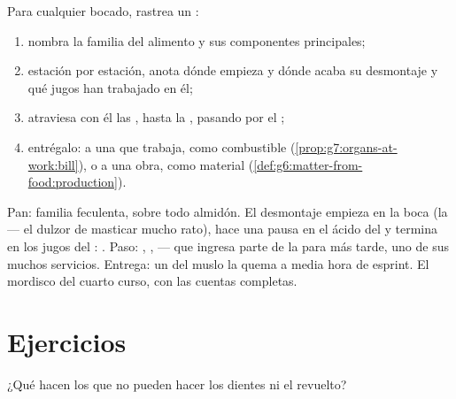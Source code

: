 \begin{method}\label{met:g7:digestion-and-nutrients:trace}
Para cualquier bocado, rastrea un :
\begin{enumerate}
  \item nombra la familia del alimento y sus componentes principales;
  \item estación por estación, anota dónde empieza y dónde acaba su
        desmontaje y qué jugos han trabajado en él;
  \item atraviesa con él las , hasta la , pasando por
        el ;
  \item entrégalo: a una  que trabaja, como combustible
        (\cref{prop:g7:organs-at-work:bill}), o a una obra, como
        material (\cref{def:g6:matter-from-food:production}).
\end{enumerate}
\end{method}

\begin{example}\label{ex:g7:digestion-and-nutrients:breadtrace}
Pan: familia feculenta, sobre todo almidón. El desmontaje empieza en la
boca (la  --- el dulzor de masticar mucho rato), hace una pausa
en el ácido del  y termina en los jugos del :
. Paso: , ,  --- que ingresa parte de la
 para más tarde, uno de sus muchos servicios. Entrega: un
 del muslo la quema a media hora de esprint. El mordisco del
cuarto curso, con las cuentas completas.
\end{example}

\section{Ejercicios}

\begin{exercise}[$\star$]\label{exo:g7:digestion-and-nutrients:1}
¿Qué hacen los  que no pueden hacer los dientes ni el
revuelto?
\end{exercise}

